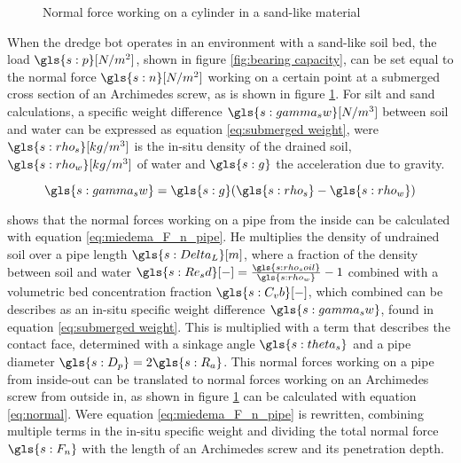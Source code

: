 \begin{figure}[!htb]
\begin{center}
		\caption{Normal force working on a cylinder in a sand-like material}\label{fig:F_n}
	\end{center}
\end{figure}

When the dredge bot operates in an environment with a sand-like soil bed, the load $ \gls{s:p} [N/m^2] $, shown in figure \ref{fig:bearing capacity}, can be set equal to the normal force $ \gls{s:n} [N/m^2] $ working on a certain point at a submerged cross section of an Archimedes screw, as is shown in figure \ref{fig:F_n}. For silt and sand calculations, a specific weight difference $ \gls{s:gamma_sw} [N/m^3] $ between soil and water can be expressed as equation \ref{eq:submerged weight}, were $ \gls{s:rho_s} [kg/m^3] $ is the in-situ density of the drained soil, $ \gls{s:rho_w} [kg/m^3] $ of water and $ \gls{s:g} $ the acceleration due to gravity.

\begin{sBox}
	\begin{equation}\label{eq:submerged weight}
	\gls{s:gamma_sw} = \gls{s:g} (\gls{s:rho_s} - \gls{s:rho_w})
	\end{equation}
\end{sBox}

\citet{miedema_slurry_2016} shows that the normal forces working on a pipe from the inside can be calculated with equation \ref{eq:miedema_F_n_pipe}. He multiplies the density of undrained soil over a pipe length $ \gls{s:Delta_L} [m] $, where a fraction of the density between soil and water $ \gls{s:Re_sd} [-] = \frac{\gls{s:rho_soil}}{\gls{s:rho_w}} - 1$ combined with a volumetric bed concentration fraction $ \gls{s:C_vb} [-] $, which combined can be describes as an in-situ specific weight difference $ \gls{s:gamma_sw} $, found in equation \ref{eq:submerged weight}. This is multiplied with a term that describes the contact face, determined with a sinkage angle $ \gls{s:theta_s} $ and a pipe diameter $ \gls{s:D_p} = 2 \gls{s:R_a} $. This normal forces working on a pipe from inside-out can be translated to normal forces working on an Archimedes screw from outside in, as shown in figure \ref{fig:F_n} can be calculated with equation \ref{eq:normal}. Were equation \ref{eq:miedema_F_n_pipe} is rewritten, combining multiple terms in the in-situ specific weight and dividing the total normal force $ \gls{s:F_n} $ with the length of an Archimedes screw and its penetration depth.

